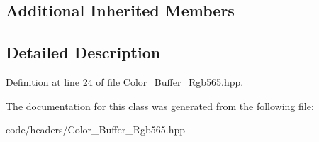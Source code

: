 \subsection*{Additional Inherited Members}


\subsection{Detailed Description}


Definition at line 24 of file Color\+\_\+\+Buffer\+\_\+\+Rgb565.\+hpp.



The documentation for this class was generated from the following file\+:\begin{DoxyCompactItemize}
\item 
code/headers/Color\+\_\+\+Buffer\+\_\+\+Rgb565.\+hpp\end{DoxyCompactItemize}
